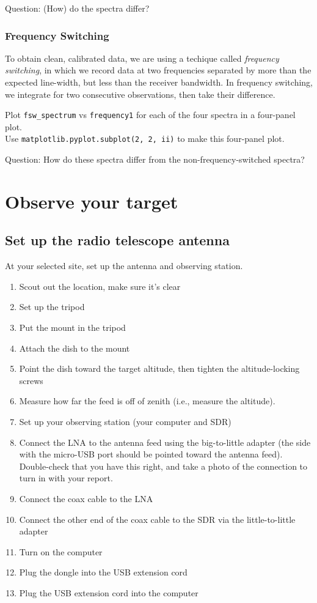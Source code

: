 \documentclass[11pt]{article}
\begin{document}
Question: (How) do the spectra differ?

\subsubsection{Frequency Switching}
\label{sec:fsw}
To obtain clean, calibrated data, we are using a techique called \emph{frequency switching},
in which we record data at two frequencies separated by more than the expected line-width,
but less than the receiver bandwidth.  In frequency switching, we integrate for two consecutive
observations, then take their difference.

Plot \verb|fsw_spectrum| vs \verb|frequency1| for each of the four spectra in a four-panel plot. \\
Use \verb|matplotlib.pyplot.subplot(2, 2, ii)| to make this four-panel plot.

Question: How do these spectra differ from the non-frequency-switched spectra?


\clearpage
\section{Observe your target}
\label{sec:observe}
\subsection{Set up the radio telescope antenna}
At your selected site, set up the antenna and observing station.

\begin{enumerate}
    \item Scout out the location, make sure it's clear
    \item Set up the tripod
    \item Put the mount in the tripod
    \item Attach the dish to the mount
    \item Point the dish toward the target altitude, then tighten the altitude-locking screws
    \item Measure how far the feed is off of zenith (i.e., measure the altitude).
    \item Set up your observing station (your computer and SDR)
    \item Connect the LNA to the antenna feed using the big-to-little adapter
        (the side with the micro-USB port should be pointed toward the antenna
        feed).  Double-check that you have this right, and take a photo of the connection to turn in with your report.
    \item Connect the coax cable to the LNA
    \item Connect the other end of the coax cable to the SDR via the little-to-little adapter
    \item Turn on the computer
    \item Plug the dongle into the USB extension cord
    \item Plug the USB extension cord into the computer
\end{enumerate}
\end{document}
